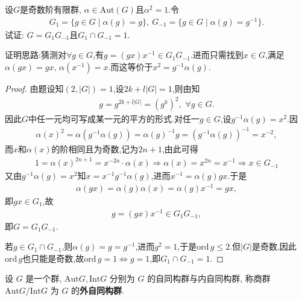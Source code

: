 \documentclass[../../main.tex]{subfiles}%
\begin{document}
\begin{example}
设$G$是奇数阶有限群, $\alpha\in \mathrm{Aut}(G)$且$\alpha^2=1$.令
\begin{align*}
G_1=\{g\in G\mid \alpha(g)=g\},\ G_{-1}=\{g\in G\mid \alpha(g)=g^{-1}\}.
\end{align*}
试证: $G=G_1G_{-1}$且$G_1\cap G_{-1}=1$.
\end{example}
\begin{note}
证明思路:猜测对$\forall g\in G$,有$g=(gx)x^{-1}\in G_1G_{-1}$.进而只需找到$x\in G$,满足$\alpha(gx)=gx,\,\alpha(x^{-1})=x$.而这等价于$x^2=g^{-1}\alpha(g)$.
\end{note}
\begin{proof}

由题设知$(2,|G|)=1$,设$2k+l|G|=1$,则由知
\begin{align*}
g=g^{2k+l|G|}=(g^k)^2,\,\,\forall g\in G.
\end{align*}
因此$G$中任一元均可写成某一元的平方的形式.对任一$g\in G$,设$g^{-1}\alpha(g)=x^2$.因
\begin{align*}
\alpha(x)^2=\alpha(g^{-1}\alpha(g))=\alpha(g)^{-1}g=(g^{-1}\alpha(g))^{-1}=x^{-2},
\end{align*}
而$x$和$\alpha(x)$的阶相同且为奇数,记为$2n+1$,由此可得
\begin{align*}
1=\alpha \left( x \right) ^{2n+1}=x^{-2n}\cdot \alpha \left( x \right) \Longrightarrow \alpha \left( x \right) =x^{2n}=x^{-1}\Longrightarrow x\in G_{-1}
\end{align*}
又由$g^{-1}\alpha(g)=x^2$知$x=x^{-1}g^{-1}\alpha(g)$,进而$x^{-1}=\alpha(g)gx$.于是
\begin{align*}
\alpha(gx)=\alpha(g)\alpha(x)=\alpha(g)x^{-1}=gx,
\end{align*}
即$gx\in G_1$,故
\begin{align*}
g=(gx)x^{-1}\in G_1G_{-1},
\end{align*}
即$G=G_1G_{-1}$.

若$g\in G_1\cap G_{-1}$,则$\alpha(g)=g=g^{-1}$,进而$g^2=1$,于是$\text{ord}\,g\leqslant 2$.但$|G|$是奇数,因此$\text{ord}\,g$也只能是奇数,故$\text{ord}\,g=1 \iff g=1$,即$G_1\cap G_{-1}=1$.


\end{proof}

\begin{definition}
设 \( G \) 是一个群, \( \text{Aut}G, \text{Int}G \) 分别为 \( G \) 的自同构群与内自同构群, 称商群 \( \text{Aut}G/\text{Int}G \) 为 \( G \) 的\textbf{外自同构群}.
\end{definition}
\end{document}
